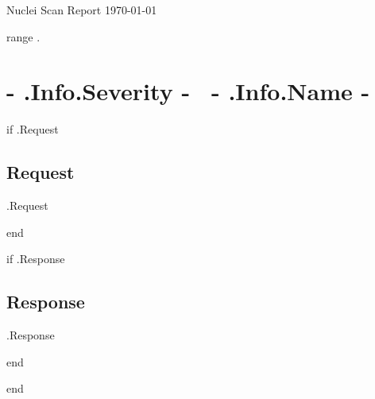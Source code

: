 \documentclass{article}
\begin{document}

\begin{titlepage}
\begin{center}
{\huge Nuclei Scan Report}
\vfill
\large{\today}

\end{center}
\end{titlepage}


{{range .}}

	\section{ \colorbox{ {{- .Info.Severity -}} }{ {{- .Info.Severity -}} }~{{- .Info.Name -}} }

	{{if .Request}}

	\subsection{Request}

    \begin{Highlighting}
{{.Request}} 
    \end{Highlighting}
	{{end}}

	{{if .Response}}
    \subsection{Response}
    \begin{Highlighting}
{{.Response}}
    \end{Highlighting}
	{{end}}
 
{{end}}

\end{document}

